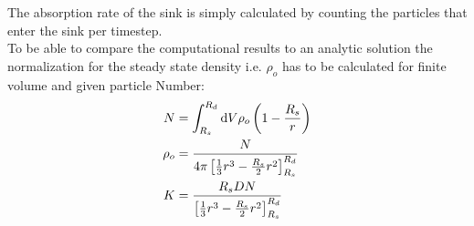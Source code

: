The absorption rate of the sink is simply calculated by counting the particles that enter the sink per timestep. \\
To be able to compare the computational results to an analytic solution the normalization for the steady state density i.e. $\rho_o$ has to be calculated for finite volume and given particle Number:
\begin{align}
    N &= \int_{R_s}^{R_d} {\rm d} V \rho_o \left( 1 - \frac{R_s}{r} \right) \\
    \rho_o &= \frac{N}{4 \pi \left[ \frac{1}{3}r^{3} - \frac{R_s}{2}r^{2} \right]_{R_s}^{R_d}} \\
    K &= \frac{R_s D N}{  \left[ \frac{1}{3}r^{3} - \frac{R_s}{2}r^{2} \right]_{R_s}^{R_d}}
    \label{normalization}
\end{align}

